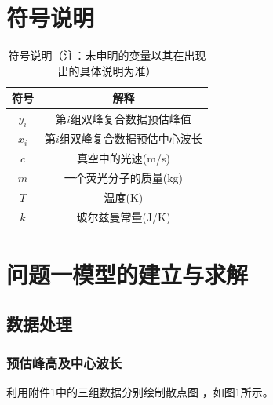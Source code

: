 \documentclass{article}
\numberwithin{equation}{subsection}
\begin{document}
{\centering\section{符号说明}}
\begin{table}[H]
    \centering
    \begin{tabular}{c|c}
\hline
符号&解释\\
\hline
$y_{i}$&第$i$组双峰复合数据预估峰值\\
$x_{i}$&第$i$组双峰复合数据预估中心波长\\
$c$&真空中的光速(m/s)\\
$m$&一个荧光分子的质量(kg)\\
$T$&温度(K)\\			
$k$&玻尔兹曼常量(J/K)\\
\hline
    \end{tabular}
    \caption{符号说明（注：未申明的变量以其在出现出的具体说明为准）}
    \label{tab:my_label}
\end{table}



{\centering\section{问题一模型的建立与求解}}

\subsection{数据处理}

\subsubsection{预估峰高及中心波长}
利用附件1中的三组数据分别绘制散点图 ，如图1所示。
\end{document}
